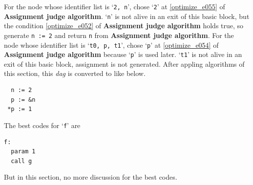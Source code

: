 \begin{Example}
For the node whose identifier list is `{\tt{2, n}}',
chose `{\tt{2}}' at \ref{optimize_e055} of {\bf Assignment judge algorithm}.
`{\tt{n}}' is not alive in an exit of this basic block, but
the condition \ref{optimize_e052} of {\bf Assignment judge algorithm}
holds true, so generate {\tt{n := 2}} and return {\tt{n}} from
{\bf Assignment judge algorithm}.
For the node whose identifier list is `{\tt{t0, p, t1}}',
chose `{\tt{p}}' at \ref{optimize_e054} of {\bf Assignment judge
 algorithm} because `{\tt{p}}' is used later.
 `{\tt{t1}}' is not alive in an exit of this basic block,
assignment is not generated.
After appling algorithms of this section,
this {\em dag} is converted to like below.
\begin{verbatim}
  n := 2
  p := &n
 *p := 1
\end{verbatim}
The best codes for `{\tt{f}}' are
\begin{verbatim}
f:
  param 1
  call g
\end{verbatim}
But in this section, no more discussion for the best codes.
\end{Example}


